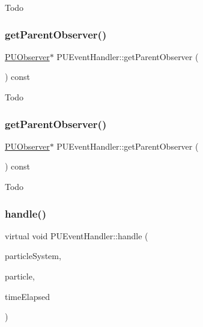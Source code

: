 Todo \mbox{\label{classPUEventHandler_a1934c2484b1127c94fbf235bbb6af892}} 
\subsubsection{\texorpdfstring{get\+Parent\+Observer()}{getParentObserver()}\hspace{0.1cm}{\footnotesize\ttfamily [1/2]}}
{\footnotesize\ttfamily \hyperlink{classPUObserver}{P\+U\+Observer}$\ast$ P\+U\+Event\+Handler\+::get\+Parent\+Observer (\begin{DoxyParamCaption}\item[{void}]{ }\end{DoxyParamCaption}) const\hspace{0.3cm}{\ttfamily [inline]}}

Todo \mbox{\label{classPUEventHandler_a1934c2484b1127c94fbf235bbb6af892}} 
\subsubsection{\texorpdfstring{get\+Parent\+Observer()}{getParentObserver()}\hspace{0.1cm}{\footnotesize\ttfamily [2/2]}}
{\footnotesize\ttfamily \hyperlink{classPUObserver}{P\+U\+Observer}$\ast$ P\+U\+Event\+Handler\+::get\+Parent\+Observer (\begin{DoxyParamCaption}\item[{void}]{ }\end{DoxyParamCaption}) const\hspace{0.3cm}{\ttfamily [inline]}}

Todo \mbox{\label{classPUEventHandler_a760172609708c65548dcac364c9b3b9c}} 
\subsubsection{\texorpdfstring{handle()}{handle()}\hspace{0.1cm}{\footnotesize\ttfamily [1/2]}}
{\footnotesize\ttfamily virtual void P\+U\+Event\+Handler\+::handle (\begin{DoxyParamCaption}\item[{\hyperlink{classPUParticleSystem3D}{P\+U\+Particle\+System3D} $\ast$}]{particle\+System,  }\item[{\hyperlink{structPUParticle3D}{P\+U\+Particle3D} $\ast$}]{particle,  }\item[{float}]{time\+Elapsed }\end{DoxyParamCaption})\hspace{0.3cm}{\ttfamily [pure virtual]}}

